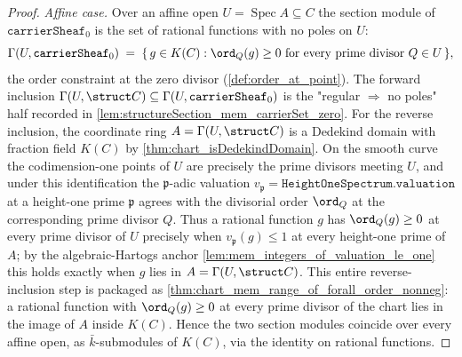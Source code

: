 \begin{proof}
        \leanok
  \emph{Affine case.} Over an affine open
  \(U = \operatorname{Spec} A \subseteq C\) the section module of
  \(\texttt{carrierSheaf}_0\) is the set of rational functions with no poles on
  \(U\):
  \[
    \Gamma(U, \texttt{carrierSheaf}_0) \;=\;
    \{\, g \in K(C) : \ord_Q(g) \geq 0 \text{ for every prime divisor }
    Q \in U \,\},
  \]
  the order constraint at the zero divisor (\cref{def:order_at_point}). The
  forward inclusion \(\Gamma(U, \struct C) \subseteq \Gamma(U,
  \texttt{carrierSheaf}_0)\) is the "regular \(\Rightarrow\) no poles" half
  recorded in \cref{lem:structureSection_mem_carrierSet_zero}. For the reverse
  inclusion, the coordinate ring \(A = \Gamma(U, \struct C)\) is a Dedekind
  domain with fraction field \(K(C)\) by \cref{thm:chart_isDedekindDomain}. On
  the smooth curve the codimension-one points of \(U\) are precisely the prime
  divisors meeting \(U\), and under this identification the \(\mathfrak p\)-adic
  valuation \(v_{\mathfrak p} = \texttt{HeightOneSpectrum.valuation}\) at a
  height-one prime \(\mathfrak p\) agrees with the divisorial order
  \(\ord_Q\) at the corresponding prime divisor \(Q\). Thus a rational function
  \(g\) has \(\ord_Q(g) \ge 0\) at every prime divisor of \(U\) precisely when
  \(v_{\mathfrak p}(g) \le 1\) at every height-one prime of \(A\); by the
  algebraic-Hartogs anchor \cref{lem:mem_integers_of_valuation_le_one} this
  holds exactly when \(g\) lies in \(A = \Gamma(U, \struct C)\). This entire
  reverse-inclusion step is packaged as
  \cref{thm:chart_mem_range_of_forall_order_nonneg}: a rational function with
  \(\ord_Q(g) \ge 0\) at every prime divisor of the chart lies in the image of
  \(A\) inside \(K(C)\). Hence the two section modules coincide over every affine
  open, as \(\bar k\)-submodules of \(K(C)\), via the identity on rational
  functions.


\end{proof}
